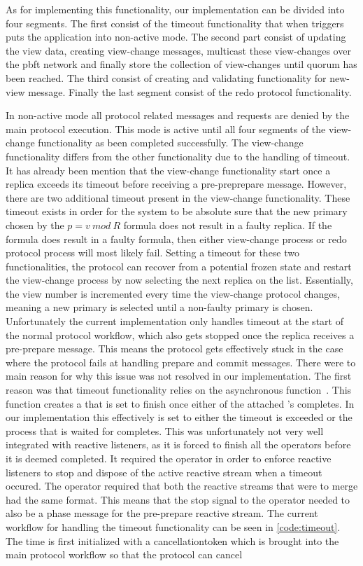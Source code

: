 As for implementing this functionality, our implementation can be divided into four segments. The first consist of the timeout functionality that when triggers puts the application into non-active mode. The second part consist of updating the view data, creating view-change messages, multicast these view-changes over the \ac{pbft} network and finally store the collection of view-changes until quorum has been reached. The third consist of creating and validating functionality for new-view message. Finally the last segment consist of the redo protocol functionality. 

In non-active mode all protocol related messages and requests are denied by the main protocol execution. This mode is active until all four segments of the view-change functionality as been completed successfully. The view-change functionality differs from the other functionality due to the handling of timeout. It has already been mention that the view-change functionality start once a replica exceeds its timeout before receiving a pre-preprepare message. However, there are two additional timeout present in the view-change functionality. These timeout exists in order for the system to be absolute sure that the new primary chosen by the $p = v ~mod~ R$ formula does not result in a faulty replica. If the formula does result in a faulty formula, then either view-change process or redo protocol process will most likely fail. Setting a timeout for these two functionalities, the protocol can recover from a potential frozen state and restart the view-change process by now selecting the next replica on the list. Essentially, the view number is incremented every time the view-change protocol changes, meaning a new primary is selected until a non-faulty primary is chosen. Unfortunately the current implementation only handles timeout at the start of the normal protocol workflow, which also gets stopped once the replica receives a pre-prepare message. This means the protocol gets effectively stuck in the case where the protocol fails at handling prepare and commit messages. There were to main reason for why this issue was not resolved in our implementation. The first reason was that timeout functionality relies on the  asynchronous function~\cite{WEB:whenany}. This function creates a  that is set to finish once either of the attached 's completes. In our implementation this effectively is set to either the timeout is exceeded or the process that is waited for completes. This was unfortunately not very well integrated with reactive listeners, as it is forced to finish all the operators before it is deemed completed. It required the  operator in order to enforce reactive listeners to stop and dispose of the active reactive stream when a timeout occured. The  operator required that both the reactive streams that were to merge had the same format. This means that the stop signal to the  operator needed to also be a phase message for the pre-prepare reactive stream. The current workflow for handling the timeout functionality can be seen in \autoref{code:timeout}. The time is first initialized with a cancellationtoken which is brought into the main protocol workflow so that the protocol can cancel 